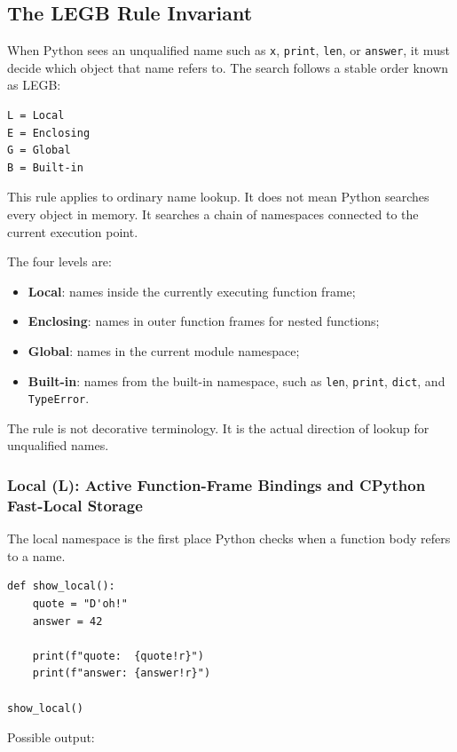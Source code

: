 \subsection{The LEGB Rule Invariant}

When Python sees an unqualified name such as \texttt{x}, \texttt{print}, \texttt{len}, or \texttt{answer}, it must decide which object that name refers to. The search follows a stable order known as LEGB:

\begin{verbatim}
L = Local
E = Enclosing
G = Global
B = Built-in
\end{verbatim}

This rule applies to ordinary name lookup. It does not mean Python searches every object in memory. It searches a chain of namespaces connected to the current execution point.

The four levels are:

\begin{itemize}
    \item \textbf{Local}: names inside the currently executing function frame;
    \item \textbf{Enclosing}: names in outer function frames for nested functions;
    \item \textbf{Global}: names in the current module namespace;
    \item \textbf{Built-in}: names from the built-in namespace, such as \texttt{len}, \texttt{print}, \texttt{dict}, and \texttt{TypeError}.
\end{itemize}

The rule is not decorative terminology. It is the actual direction of lookup for unqualified names.

\subsubsection{Local (L): Active Function-Frame Bindings and CPython Fast-Local Storage}

The local namespace is the first place Python checks when a function body refers to a name.

\begin{verbatim}
def show_local():
    quote = "D'oh!"
    answer = 42

    print(f"quote:  {quote!r}")
    print(f"answer: {answer!r}")

show_local()
\end{verbatim}

Possible output:

